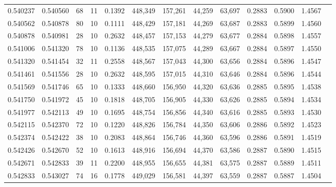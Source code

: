 \begin{tabular}{rrrrrrrrrrrrr}
0.540237 & 0.540560 &    68 &  11 &                                     0.1392 & 448,349 & 157,261 &  44,259 &  63,697 & 0.2883 & 0.5900 & 1.4567 \\
0.540562 & 0.540878 &    80 &  10 &                                     0.1111 & 448,429 & 157,181 &  44,269 &  63,687 & 0.2883 & 0.5899 & 1.4560 \\
0.540878 & 0.540981 &    28 &  10 &                                     0.2632 & 448,457 & 157,153 &  44,279 &  63,677 & 0.2884 & 0.5898 & 1.4557 \\
0.541006 & 0.541320 &    78 &  10 &                                     0.1136 & 448,535 & 157,075 &  44,289 &  63,667 & 0.2884 & 0.5897 & 1.4550 \\
0.541320 & 0.541454 &    32 &  11 &                                     0.2558 & 448,567 & 157,043 &  44,300 &  63,656 & 0.2884 & 0.5896 & 1.4547 \\
0.541461 & 0.541556 &    28 &  10 &                                     0.2632 & 448,595 & 157,015 &  44,310 &  63,646 & 0.2884 & 0.5896 & 1.4544 \\
0.541569 & 0.541746 &    65 &  10 &                                     0.1333 & 448,660 & 156,950 &  44,320 &  63,636 & 0.2885 & 0.5895 & 1.4538 \\
0.541750 & 0.541972 &    45 &  10 &                                     0.1818 & 448,705 & 156,905 &  44,330 &  63,626 & 0.2885 & 0.5894 & 1.4534 \\
0.541977 & 0.542113 &    49 &  10 &                                     0.1695 & 448,754 & 156,856 &  44,340 &  63,616 & 0.2885 & 0.5893 & 1.4530 \\
0.542115 & 0.542370 &    72 &  10 &                                     0.1220 & 448,826 & 156,784 &  44,350 &  63,606 & 0.2886 & 0.5892 & 1.4523 \\
0.542374 & 0.542422 &    38 &  10 &                                     0.2083 & 448,864 & 156,746 &  44,360 &  63,596 & 0.2886 & 0.5891 & 1.4519 \\
0.542426 & 0.542670 &    52 &  10 &                                     0.1613 & 448,916 & 156,694 &  44,370 &  63,586 & 0.2887 & 0.5890 & 1.4515 \\
0.542671 & 0.542833 &    39 &  11 &                                     0.2200 & 448,955 & 156,655 &  44,381 &  63,575 & 0.2887 & 0.5889 & 1.4511 \\
0.542833 & 0.543027 &    74 &  16 &                                     0.1778 & 449,029 & 156,581 &  44,397 &  63,559 & 0.2887 & 0.5887 & 1.4504 \\

\end{tabular}
